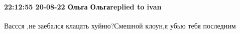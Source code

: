  
 
 
 
 

\paragraph{22:12:55 20-08-22 Ольга Ольгаreplied to ivan}

Вассся ,не заебался клацать хуйню?Смешной клоун,я убью тебя последним
